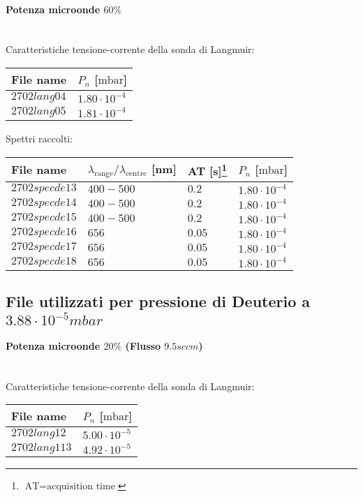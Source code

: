 \paragraph*{Potenza microonde $\text{60\%}$} ~\\
Caratteristiche tensione-corrente della sonda di Langmuir:
\begin{center}
\begin{tabular}{p{3cm}p{3cm}}
\toprule
File name	&$P_n$ [$\si{\milli\bar}$]\\
\midrule
$2702lang04$	&$1.80\cdot10^{-4}$\\
$2702lang05$	&$1.81\cdot10^{-4}$\\
\bottomrule
\end{tabular}
\end{center}

Spettri raccolti:
\begin{center}
\begin{tabular}{p{3cm}p{4cm}p{2cm}p{3cm}}
\toprule
File name	&$\lambda_\text{range}\text{/}\lambda_\text{centre}$ [nm] 	&AT [s]\footnote{$\text{AT}=\text{acquisition time}$} &$P_n$ [$\si{\milli\bar}$]\\
\midrule
$2702specde13$	&$400-500$	&$0.2$		&$1.80\cdot10^{-4}$\\
$2702specde14$	&$400-500$	&$0.2$		&$1.80\cdot10^{-4}$\\
$2702specde15$	&$400-500$	&$0.2$		&$1.80\cdot10^{-4}$\\
$2702specde16$	&$656$		&$0.05$		&$1.80\cdot10^{-4}$\\
$2702specde17$	&$656$		&$0.05$		&$1.80\cdot10^{-4}$\\
$2702specde18$	&$656$		&$0.05$		&$1.80\cdot10^{-4}$\\
\bottomrule
\end{tabular}
\end{center}



\subsection{File utilizzati per pressione di Deuterio a $3.88\cdot10^{-5}mbar$}

\paragraph*{Potenza microonde $\text{20\%}$ (Flusso $9.5sccm$) }~\\
Caratteristiche tensione-corrente della sonda di Langmuir:
\begin{center}
\begin{tabular}{p{3cm}p{3cm}}
\toprule
File name	&$P_{n}$ [$\si{\milli\bar}$]\\
\midrule
$2702lang12$	&$5.00\cdot10^{-5}$\\
$2702lang113$	&$4.92\cdot10^{-5}$\\
\bottomrule
\end{tabular}
\end{center}

